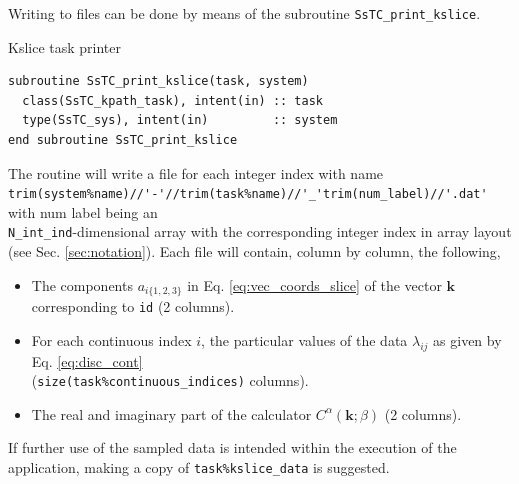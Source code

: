 \documentclass[10pt,a4paper]{article}
\begin{document}
Writing to files can be done by means of the subroutine \verb|SsTC_print_kslice|.
\begin{codebox}{Kslice task printer}
\begin{lstlisting}[caption={Interface of the ``kslice" printer.},captionpos=b]
subroutine SsTC_print_kslice(task, system)
  class(SsTC_kpath_task), intent(in) :: task
  type(SsTC_sys), intent(in)         :: system
end subroutine SsTC_print_kslice
\end{lstlisting}
\end{codebox}
The routine will write a file for each integer index with name \\ \verb|trim(system%name)//'-'//trim(task%name)//'_'trim(num_label)//'.dat'| with num label being an \\ \verb|N_int_ind|-dimensional array with the corresponding integer index in array layout (see Sec. \ref{sec:notation}). Each file will contain, column by column, the following,
\begin{tcolorbox}
\begin{itemize}
\item The components $a_{i\{1, 2, 3\}}$ in Eq. \eqref{eq:vec_coords_slice} of the vector $\bm{k}$ corresponding to \verb|id| (2 columns).
\item For each continuous index $i$, the particular values of the data $\lambda_{ij}$ as given by Eq. \eqref{eq:disc_cont} \\ (\verb|size(task%continuous_indices)| columns).
\item The real and imaginary part of the calculator $C^{\alpha}(\bm{k};\beta)$ (2 columns).
\end{itemize}
\end{tcolorbox}
If further use of the sampled data is intended within the execution of the application, making a copy of \verb|task%kslice_data| is suggested.
\end{document}

